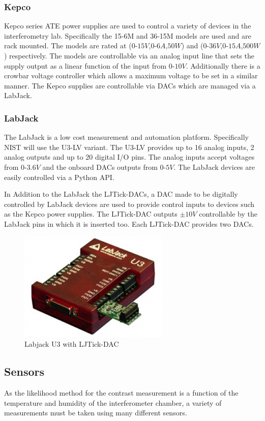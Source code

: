 \subsubsection{Kepco}
Kepco series ATE power supplies are used to control a variety of devices in the interferometry lab. Specifically the 15-6M and 36-15M models are used and are rack mounted. The models are rated at ($0$-$15V$,$0$-$6A$,$50W$) and ($0$-$36V$,$0$-$15A$,$500W$) respectively.\cite{kepco} The models are controllable via an analog input line that sets the supply output as a linear function of the input from $0$-$10V$. Additionally there is a crowbar voltage controller which allows a maximum voltage to be set in a similar manner. The Kepco supplies are controllable via DACs which are managed via a LabJack. 
\subsubsection{LabJack}
The LabJack is a low cost measurement and automation platform. Specifically NIST will use the U3-LV variant. The U3-LV provides up to 16 analog inputs, 2 analog outputs and up to 20 digital I/O pins. The analog inputs accept voltages from $0$-$3.6V$ and the onboard DACs outputs from $0$-$5V$. The LabJack devices are easily controlled via a Python API. 

In Addition to the LabJack the LJTick-DACs, a DAC made to be digitally controlled by LabJack devices are used to provide control inputs to devices such as the Kepco power supplies. The LJTick-DAC outputs $\pm10V$  controllable by the LabJack pins in which it is inserted too. Each LJTick-DAC provides two DACs. 
\begin{figure}[ht!]
\centering
\includegraphics[scale=0.5]{Figures/labjack.png}
\caption{Labjack U3 with LJTick-DAC}
\label{fig:labjack}
\end{figure}
\subsection{Sensors}
As the likelihood method for the contrast measurement is a function of the temperature and humidity of the interferometer chamber, a variety of measurements must be taken using many different sensors.
